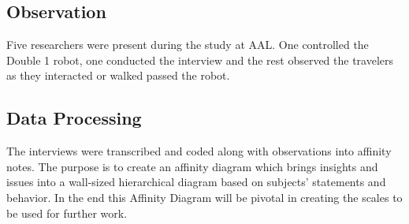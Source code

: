 \subsection{Observation}
Five researchers were present during the study at AAL. One controlled the Double 1 robot, one conducted the interview and the rest observed the travelers as they interacted or walked passed the robot. 

\subsection{Data Processing}
The interviews were transcribed and coded along with observations into affinity notes. The purpose is to create an affinity diagram \cite{Holtzblatt2005} which brings insights and issues into a wall-sized hierarchical diagram based on subjects' statements and behavior. In the end this Affinity Diagram will be pivotal in creating the scales to be used for further work.




